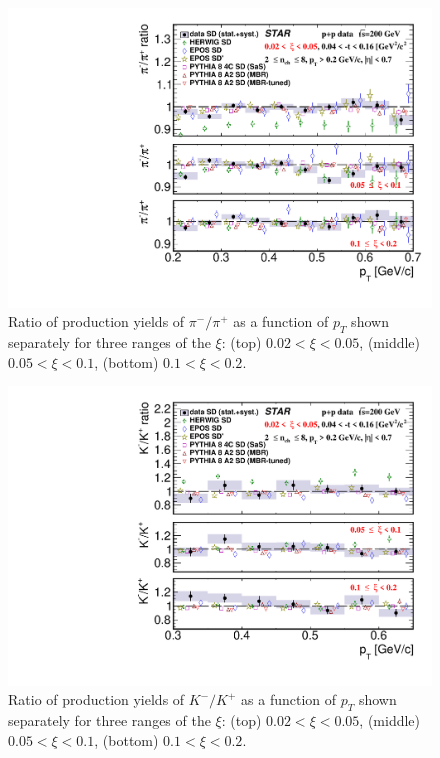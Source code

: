 \begin{figure}[bh]
	\centering
	\includegraphics[width=.99\textwidth,page=1]{chapters/chrgSTAR/img/results/particleRatio_prt_0.pdf}
	\caption[Ratio of production yields of $\pi^-/\pi^+$ as a function of $p_T$ shown separately for three ranges of the $\xi$.]{Ratio of production yields of $\pi^-/\pi^+$ as a function of $p_T$ shown separately for three ranges of the $\xi$: (top) $0.02<\xi<0.05$, (middle) $0.05<\xi<0.1$, (bottom) $0.1<\xi<0.2$.}
	\label{results_star_pion}
	
\end{figure}

\begin{figure}[bh]
	\centering
	\includegraphics[width=.99\textwidth,page=1]{chapters/chrgSTAR/img/results/particleRatio_prt_1.pdf}
	\caption[Ratio of production yields of $K^-/K^+$ as a function of $p_T$ shown separately for three ranges of the $\xi$.]{Ratio of production yields of $K^-/K^+$ as a function of $p_T$ shown separately for three ranges of the $\xi$: (top) $0.02<\xi<0.05$, (middle) $0.05<\xi<0.1$, (bottom) $0.1<\xi<0.2$.}
	\label{results_star_kaon}
	
\end{figure}


